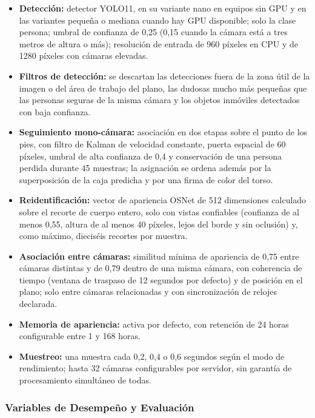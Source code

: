 \begin{itemize}
  \item \textbf{Detección:} detector YOLO11, en su variante nano en equipos sin GPU y en las
  variantes pequeña o mediana cuando hay GPU disponible; solo la clase persona; umbral de
  confianza de 0,25 (0,15 cuando la cámara está a tres metros de altura o más); resolución de
  entrada de 960 píxeles en CPU y de 1280 píxeles con cámaras elevadas.
  \item \textbf{Filtros de detección:} se descartan las detecciones fuera de la zona útil de la
  imagen o del área de trabajo del plano, las dudosas mucho más pequeñas que las personas
  seguras de la misma cámara y los objetos inmóviles detectados con baja confianza.
  \item \textbf{Seguimiento mono-cámara:} asociación en dos etapas sobre el punto de los pies,
  con filtro de Kalman de velocidad constante, puerta espacial de 60 píxeles, umbral de alta
  confianza de 0,4 y conservación de una persona perdida durante 45 muestras; la asignación
  se ordena además por la superposición de la caja predicha y por una firma de color del torso.
  \item \textbf{Reidentificación:} vector de apariencia OSNet de 512 dimensiones calculado
  sobre el recorte de cuerpo entero, solo con vistas confiables (confianza de al menos 0,55,
  altura de al menos 40 píxeles, lejos del borde y sin oclusión) y, como máximo, dieciséis
  recortes por muestra.
  \item \textbf{Asociación entre cámaras:} similitud mínima de apariencia de 0,75 entre cámaras
  distintas y de 0,79 dentro de una misma cámara, con coherencia de tiempo (ventana de
  traspaso de 12 segundos por defecto) y de posición en el plano; solo entre cámaras
  relacionadas y con sincronización de relojes declarada.
  \item \textbf{Memoria de apariencia:} activa por defecto, con retención de 24 horas
  configurable entre 1 y 168 horas.
  \item \textbf{Muestreo:} una muestra cada 0,2, 0,4 o 0,6 segundos según el modo de
  rendimiento; hasta 32 cámaras configurables por servidor, sin garantía de procesamiento
  simultáneo de todas.
\end{itemize}

\subsubsection{Variables de Desempeño y Evaluación}

